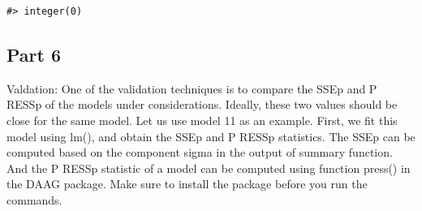 \documentclass[
]{article}
\begin{document}
\begin{verbatim}
#> integer(0)
\end{verbatim}

\subsection{Part 6}\label{part-6}

Valdation: One of the validation techniques is to compare the SSEp and P
RESSp of the models under considerations. Ideally, these two values
should be close for the same model. Let us use model 11 as an example.
First, we fit this model using lm(), and obtain the SSEp and P RESSp
statistics. The SSEp can be computed based on the component sigma in the
output of summary function. And the P RESSp statistic of a model can be
computed using function press() in the DAAG package. Make sure to
install the package before you run the commands.
\end{document}
